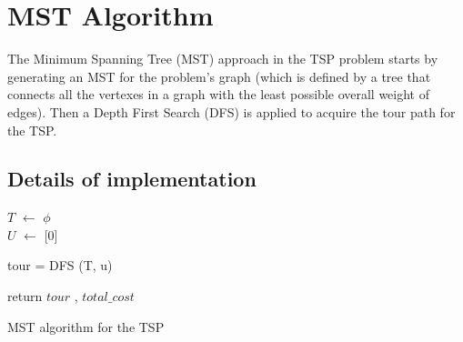 \documentclass[11pt, english]{article}
\begin{document}
\section{MST Algorithm}
The Minimum Spanning Tree (MST) approach in the TSP problem starts by generating an MST for the problem's graph (which is defined by a tree that connects all the vertexes in a graph with the least possible overall weight of edges). Then a Depth First Search (DFS) is applied to acquire the tour path for the TSP.

\subsection{Details of implementation}

\begin{center}
	\colorbox[gray]{0.95}{
		\begin{minipage}{0.75\textwidth}
			\begin{algorithm}[H]
				\bigskip
				$\textit{T}$ $\leftarrow$ $\phi$ \\
				$\textit{U}$ $\leftarrow$ [0] \\
				
			
				tour = DFS (T, u)
				
				
				return $\textit{tour}$ , $\textit{total\_cost}$\\
				\bigskip
				\caption{MST algorithm for the TSP}
			\end{algorithm}
	\end{minipage}}
\end{center}
\end{document}

